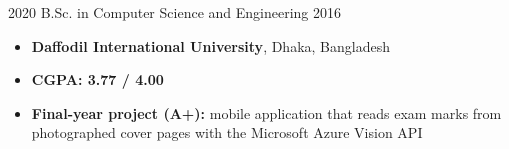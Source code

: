 %
%
%


\begin{experiences}
    \mentoring
        {2020}
        {B.Sc. in Computer Science and Engineering}
        {2016}
        {
            \begin{itemize}
                \item \textbf{Daffodil International University}, Dhaka, Bangladesh
                \item \textbf{CGPA: 3.77 / 4.00}
                \item \textbf{Final-year project (A+):} mobile application that reads exam
                      marks from photographed cover pages with the Microsoft Azure Vision API
            \end{itemize}
        }
\end{experiences}
